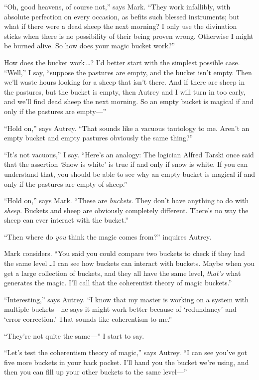 {
 ``Oh, good heavens, of course
not,'' says Mark. ``They work
infallibly, with absolute perfection on every occasion, as befits such
blessed instruments; but what if there were a dead sheep the next
morning? I only use the divination sticks when there is no possibility
of their being proven wrong. Otherwise I might be burned alive. So how
does your magic bucket work?''}

{
 How does the bucket work\,\ldots ? I'd better start
with the simplest possible case.
``Well,'' I say,
``suppose the pastures are empty, and the bucket
isn't empty. Then we'll waste hours
looking for a sheep that isn't there. And if there are
sheep in the pastures, but the bucket is empty, then Autrey and I will
turn in too early, and we'll find dead sheep the next
morning. So an empty bucket is magical if and only if the pastures are
empty---''}

{
 ``Hold on,'' says Autrey.
``That sounds like a vacuous tautology to me.
Aren't an empty bucket and empty pastures obviously the
same thing?''}

{
 ``It's not
vacuous,'' I say.
``Here's an analogy: The logician
Alfred Tarski once said that the assertion `Snow is
white' is true if and only if snow is white. If you can
understand that, you should be able to see why an empty bucket is
magical if and only if the pastures are empty of
sheep.''}

{
 ``Hold on,'' says Mark.
``These are \textit{buckets}. They
don't have anything to do with \textit{sheep}. Buckets
and sheep are obviously completely different. There's
no way the sheep can ever interact with the
bucket.''}

{
 ``Then where do \textit{you} think the magic
comes from?'' inquires Autrey.}

{
 Mark considers. ``You said you could compare two
buckets to check if they had the same level\,\ldots I can see how buckets
can interact with buckets. Maybe when you get a large collection of
buckets, and they all have the same level,
\textit{that's} what generates the magic.
I'll call that the coherentist theory of magic
buckets.''}

{
 ``Interesting,'' says Autrey.
``I know that my master is working on a system with
multiple buckets---he says it might work better because of
`redundancy' and `error
correction.' That sounds like coherentism to
me.''}

{
 ``They're not quite the
same---'' I start to say.}

{
 ``Let's test the coherentism
theory of magic,'' says Autrey. ``I
can see you've got five more buckets in your back
pocket. I'll hand you the bucket we're
using, and then you can fill up your other buckets to the same
level---''}

